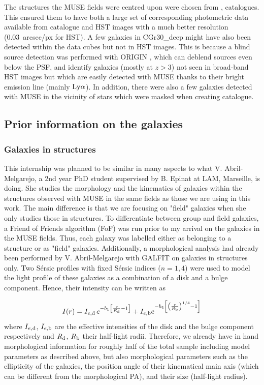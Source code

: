 The structures the MUSE fields were centred upon were chosen from ,  catalogues. This ensured them to have both a large set of corresponding photometric data available from  catalogue and HST images with a much better resolution (\SI{0.03}{arcsec/px} for HST). A few galaxies in CGr30\_deep might have also been detected within the data cubes but not in HST images. This is because a blind source detection was performed with ORIGIN , which can deblend sources even below the PSF, and identify galaxies (mostly at $z > 3$) not seen in broad-band HST images but which are easily detected with MUSE thanks to their bright emission line (mainly $\rm{Ly}\alpha$). In addition, there were also a few galaxies detected with MUSE in the vicinity of stars which were masked when creating  catalogue.

\subsection{Prior information on the galaxies}

\subsubsection{Galaxies in structures}

This internship was planned to be similar in many aspects to what  V. Abril-Melgarejo, a 2nd year PhD student supervised by B. Epinat at LAM, Marseille, is doing. She studies the morphology and the kinematics of galaxies within the structures observed with MUSE in the same fields as those we are using in this work. The main difference is that we are focusing on "field" galaxies when she only studies those in structures. To differentiate between group and field galaxies, a Friend of Friends algorithm (FoF) was run prior to my arrival on the galaxies in the MUSE fields. Thus, each galaxy was labelled either as belonging to a structure or as "field" galaxies. Additionally, a morphological analysis had already been performed by V. Abril-Melgarejo with GALFIT on galaxies in structures only. Two Sérsic profiles with fixed Sérsic indices ($n = 1, 4$) were used to model the light profile of these galaxies as a combination of a disk and a bulge component. Hence, their intensity can be written as

\begin{equation}
	I(r) = I_{e, \rm{d}} \, e^{-b_1 \left [ \frac{r}{R_{\rm{d}}} -1 \right ]} + I_{e , \rm{b}} e^{- b_4 \left [ \left ( \frac{r}{R_{\rm{b}}} \right )^{1/4} -1 \right ]}
	\label{eq:GALFIT_light_profile}
\end{equation}
where $I_{e, \rm{d}}$, $I_{e, \rm{b}}$ are the effective intensities of the disk and the bulge component respectively and $R_{\rm{d}}$, $R_{\rm{b}}$ their half-light radii. Therefore, we already have in hand morphological information for roughly half of the total sample including model parameters as described above, but also morphological parameters such as the ellipticity of the galaxies, the position angle of their kinematical main axis (which can be different from the morphological PA), and their size (half-light radius).

